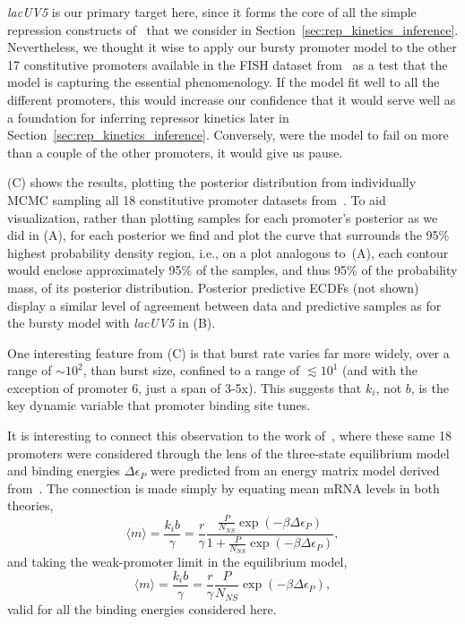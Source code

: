 \textit{lacUV5} is our primary target here, since it forms the
core of all the simple repression constructs of~\cite{Jones2014}
that we consider in Section~\ref{sec:rep_kinetics_inference}.
Nevertheless, we thought it wise to apply our bursty promoter
model to the other 17 constitutive promoters available in the
FISH dataset from~\cite{Jones2014} as a test that the model is
capturing the essential phenomenology. If the model fit well to
all the different promoters, this would increase our confidence
that it would serve well as a foundation for inferring repressor
kinetics later in Section~\ref{sec:rep_kinetics_inference}.
Conversely, were the model to fail on more than a couple of the
other promoters, it would give us pause.


(C) shows the results, plotting the
posterior distribution from individually MCMC sampling all 18
constitutive promoter datasets from~\cite{Jones2014}. To aid
visualization, rather than plotting samples for each promoter's
posterior as we did in (A), for each
posterior we find and plot the curve that surrounds the 95\%
highest probability density region, i.e., on a plot analogous
to~(A), each contour would enclose approximately 95\% of the
samples, and thus 95\% of the probability mass,
of its posterior distribution.
Posterior predictive ECDFs (not shown) display a similar level of
agreement between data and predictive samples as for the bursty
model with \textit{lacUV5} in (B).

One interesting feature from (C) is
that burst rate varies far more widely, over a range of
$\sim10^2$, than burst size, confined to a range of
$\lesssim10^1$ (and with the exception of promoter 6, just a span
of 3-5x). This suggests that $k_i$, not $b$, is the key dynamic
variable that promoter binding site tunes.

It is interesting to connect this observation to the work
of~\cite{Brewster2012}, where these same 18 promoters were
considered through the lens of the three-state equilibrium model
and binding energies $\Delta\epsilon_P$ were predicted from an
energy matrix model derived from~\cite{Kinney2010}. The connection
is made simply by equating mean mRNA levels in both theories,
\begin{equation}
\langle m \rangle = \frac{k_i b}{\gamma}
        = \frac{r}{\gamma}
        \frac{\frac{P}{N_{NS}}\exp(-\beta\Delta\epsilon_P)}
                {1+\frac{P}{N_{NS}}\exp(-\beta\Delta\epsilon_P)},
\end{equation}
and taking the weak-promoter limit in the equilibrium model,
\begin{equation}
\langle m \rangle = \frac{k_i b}{\gamma}
        = \frac{r}{\gamma} \frac{P}{N_{NS}}\exp(-\beta\Delta\epsilon_P),
\end{equation}
valid for all the binding energies considered here.

